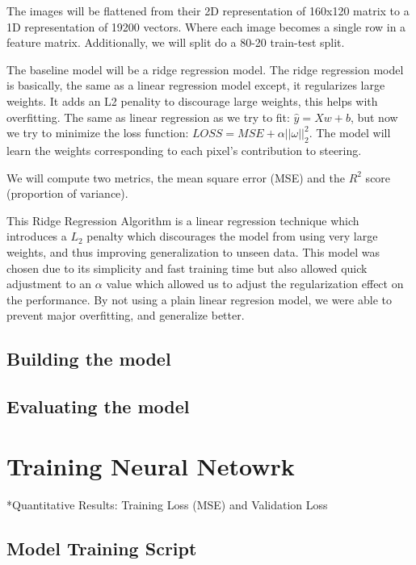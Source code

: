 \documentclass{article} %
\begin{document}
The images will be flattened from their 2D representation of 160x120 matrix to a 1D representation
of 19200 vectors. Where each image becomes a single row in a feature matrix. Additionally,
we will split do a 80-20 train-test split.

The baseline model will be a ridge regression model. The ridge regression model is basically, the
same as a linear regression model except, it regularizes large weights. It adds an L2 penality to
discourage large weights, this helps with overfitting. The same as linear regression as we try to
fit: $\hat{y} = Xw + b$, but now we try to minimize the loss function: $LOSS = MSE + \alpha 
||\omega||^2_2$. The model will learn the weights corresponding to each pixel's contribution to 
steering.

We will compute two metrics, the mean square error (MSE) and the $R^2$ score (proportion of variance). 

This Ridge Regression Algorithm is a linear regression technique which introduces a $L_2$ penalty which discourages the model
from using very large weights, and thus improving generalization to unseen data. This model was chosen due to its simplicity and
fast training time but also allowed quick adjustment to an $\alpha$ value which allowed us to adjust the regularization effect
on the performance. By not using a plain linear regresion model, we were able to prevent major overfitting, and generalize better.






\subsection{Building the model}

\subsection{Evaluating the model}



\section{Training Neural Netowrk}

*Quantitative Results: Training Loss (MSE) and Validation Loss

\subsection{Model Training Script}
\end{document}
